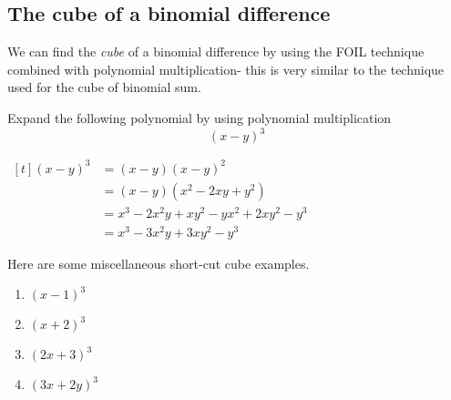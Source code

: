 \subsection{The cube of a binomial difference}
We can find the \emph{cube} of a binomial difference by using the FOIL technique combined 
with polynomial multiplication- this is very similar to the technique used for the 
cube of binomial sum.
\begin{myexample}
Expand the following polynomial by using polynomial multiplication
\[
	(x-y)^3
\]
\end{myexample}
\begin{myProof}
$
\begin{aligned}[t]
(x-y)^3 & = (x-y)(x-y)^2\\
& = (x-y)(x^2-2xy+y^2)\\
& = x^3-2x^2y+xy^2 - yx^2 + 2xy^2 - y^3\\
& = x^3 -3x^2y + 3 xy^2 - y^3
\end{aligned}
$
\end{myProof}
\begin{myexample}
Here are some miscellaneous short-cut cube examples.
\drillandskill
\end{myexample}
\begin{myProof}				
		\begin{enumerate}
			\item $(x-1)^3$
			\item $(x+2)^3$
			\item $(2x+3)^3$
			\item $(3x+2y)^3$
		\end{enumerate}
\end{myProof} 




